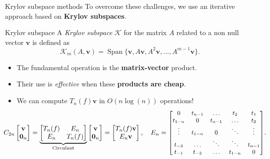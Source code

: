 \documentclass[aspectratio=169,xcolor=dvipsnames]{beamer}
\begin{document}
\begin{frame}{Krylov subspace methods}
To overcome these challenges, we use an iterative approach based on \textbf{Krylov subspaces}.

\begin{block}{Krylov subspace}
A \emph{Krylov subspace} $\mathcal{K}$ for the matrix $A$ related to
a non null vector $\mathbf{v}$ is defined as
\begin{equation*}
	\mathcal{K}_m(A,\mathbf{v})=\operatorname{Span}\{ \mathbf{v},A \mathbf{v},A^2 \mathbf{v},\ldots,A^{m-1} \mathbf{v} \}.
\end{equation*}
\end{block}

\begin{itemize}
	\item[\faExclamationCircle]<2-> The fundamental operation is the \textbf{matrix-vector} product.
	\item[\faLightbulb]<3-> Their use is \emph{effective} when these \textbf{products are cheap}.
	\item[\faMoneyBillWave]<4-> We can compute $T_n(f)\mathbf{v}$ in $O(n\log(n))$ operations!
	\[
	\hspace{-2em}C_{2n} \begin{bmatrix}
		\mathbf{v} \\
		\mathbf{0}_{n} \end{bmatrix}
	= \underbrace{\begin{bmatrix}
		T_n(f) & E_n \\
		E_n & T_n(f)
	\end{bmatrix}}_{\text{Circulant}}\begin{bmatrix}
		\mathbf{v} \\
		\mathbf{0}_{n} \end{bmatrix} = \begin{bmatrix}
		T_n(f) \mathbf{v} \\
		 E_n \mathbf{v} \end{bmatrix}, \quad     {\small E_n = \begin{bmatrix}
		0 & t_{n-1} & \ldots & t_{2} & t_{1} \\
		t_{1-n} & 0 & t_{n-1} & \ldots & t_{2}  \\
		\vdots & t_{1-n} & 0 & \ddots &  \vdots \\
		t_{-2} & \ldots & \ddots & \ddots & t_{n-1} \\
		t_{-1} & t_{-2} & \ldots & t_{1-n} & 0
	\end{bmatrix}}.
	\] 
\end{itemize}

\end{frame}
\end{document}
